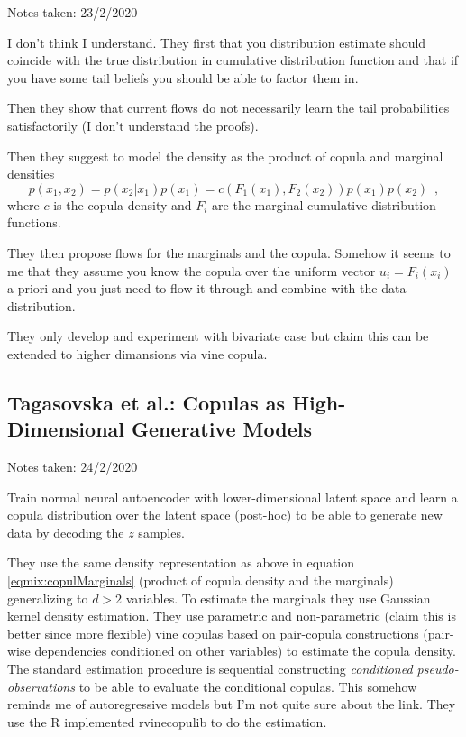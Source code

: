\begin{notebox}

\hfill Notes taken: 23/2/2020 
\end{notebox}

I don't think I understand. 
They first that you distribution estimate should coincide with the true distribution in cumulative distribution function and that if you have some tail beliefs you should be able to factor them in.

Then they show that current flows do not necessarily learn the tail probabilities satisfactorily (I don't understand the proofs).

Then they suggest to model the density as the product of copula and marginal densities
\begin{equation}\label{eqmix:copulMarginals}
p(x_1, x_2) = p(x_2 | x_1) p(x_1) = c(F_1(x_1), F_2(x_2)) p(x_1) p(x_2) \enspace ,
\end{equation}
where $c$ is the copula density and $F_i$ are the marginal cumulative distribution functions.

They then propose flows for the marginals and the copula. Somehow it seems to me that they assume you know the copula over the uniform vector $u_i = F_i(x_i)$ a priori and you just need to flow it through and combine with the data distribution.

They only develop and experiment with bivariate case but claim this can be extended to higher dimansions via vine copula.


\subsection{Tagasovska et al.: Copulas as High-Dimensional Generative Models}

\begin{notebox}

\hfill Notes taken: 24/2/2020 
\end{notebox}

Train normal neural autoencoder with lower-dimensional latent space and learn a copula distribution over the latent space (post-hoc) to be able to generate new data by decoding the $z$ samples.

They use the same density representation as above in equation \eqref{eqmix:copulMarginals} (product of copula density and the marginals) generalizing to $d>2$ variables.
To estimate the marginals they use Gaussian kernel density estimation.
They use parametric and non-parametric (claim this is better since more flexible) vine copulas based on pair-copula constructions (pair-wise dependencies conditioned on other variables) to estimate the copula density. The standard estimation procedure is sequential constructing \emph{conditioned pseudo-observations} to be able to evaluate the conditional copulas. This somehow reminds me of autoregressive  models but I'm not quite sure about the link.
They use the R implemented rvinecopulib to do the estimation.


